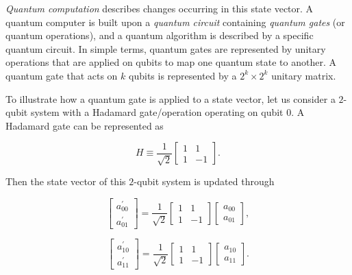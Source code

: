 \par \textit{Quantum computation} describes changes occurring in this state vector. A quantum computer is built upon a \textit{quantum circuit} containing \textit{quantum gates} (or quantum operations), and a quantum algorithm is described by a specific quantum circuit. In simple terms, quantum gates are represented by unitary operations that are
applied on qubits to map one quantum state to another. A quantum gate that acts on $k$ qubits is represented by a $2^k\times2^k$ unitary matrix. 

\par To illustrate how a quantum gate is applied to a state vector, let us consider a $2$-qubit system with a Hadamard gate/operation operating on qubit $0$. A Hadamard gate can be represented as  

\begin{equation}%
H \equiv \frac{1}{\sqrt{2}} \begin{bmatrix} 1 & 1 \\ 1 & -1 \end{bmatrix}.
\end{equation}

\noindent Then the state vector of this $2$-qubit system is updated through 

\begin{equation}%
\begin{bmatrix} a_{00}^{\prime} \\ a_{01}^{\prime} \end{bmatrix} = \frac{1}{\sqrt{2}} \begin{bmatrix} 1 & 1 \\ 1 & -1 \end{bmatrix} \begin{bmatrix} a_{00} \\ a_{01} \end{bmatrix},
\end{equation}

\begin{equation}%
\begin{bmatrix} a_{10}^{\prime} \\ a_{11}^{\prime} \end{bmatrix} = \frac{1}{\sqrt{2}} \begin{bmatrix} 1 & 1 \\ 1 & -1 \end{bmatrix} \begin{bmatrix} a_{10} \\ a_{11} \end{bmatrix}.
\end{equation}

